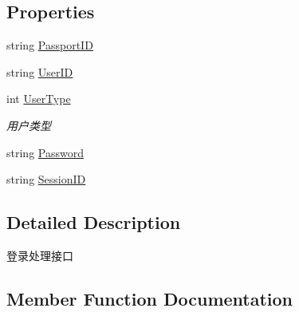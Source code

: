 \subsection*{Properties}
\begin{DoxyCompactItemize}
\item 
string \mbox{\hyperlink{interface_t_net_1_1_sns_1_1_i_login_aed0baa9f942d6d6fb57c6516178d0937}{Passport\+ID}}
\item 
string \mbox{\hyperlink{interface_t_net_1_1_sns_1_1_i_login_ae0aad41c66bb7b403169f3f4dfa554b4}{User\+ID}}
\item 
int \mbox{\hyperlink{interface_t_net_1_1_sns_1_1_i_login_ae4d1b4e66a3ebbde31ec5380b949cd98}{User\+Type}}
\begin{DoxyCompactList}\small\item\em 用户类型 \end{DoxyCompactList}\item 
string \mbox{\hyperlink{interface_t_net_1_1_sns_1_1_i_login_a163519d968ebccf67d72e0b5215fc5ef}{Password}}
\item 
string \mbox{\hyperlink{interface_t_net_1_1_sns_1_1_i_login_a40f26117acff91385e41f873379624d2}{Session\+ID}}
\end{DoxyCompactItemize}


\subsection{Detailed Description}
登录处理接口 



\subsection{Member Function Documentation}
\mbox{\label{interface_t_net_1_1_sns_1_1_i_login_a55b0a846946c8ea19a120d8fdb2d7b86}} 
